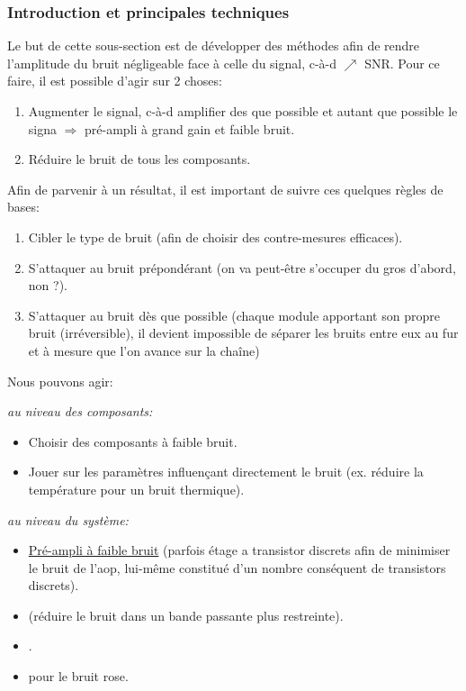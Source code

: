 \subsubsection{Introduction et principales techniques}
Le but de cette sous-section est de développer des méthodes afin de rendre l'amplitude du bruit négligeable face à celle du signal, c-à-d \(\nearrow\) SNR. Pour ce faire, il est possible d'agir sur 2 choses:
\begin{enumerate}
	\item Augmenter le signal, c-à-d amplifier des que possible et autant que possible le signa \(\Rightarrow\) pré-ampli à grand gain et faible bruit.
	\item Réduire le bruit de tous les composants.
\end{enumerate}
Afin de parvenir à un résultat, il est important de suivre ces quelques règles de bases:
\begin{enumerate}
	\item Cibler le type de bruit (afin de choisir des contre-mesures efficaces).
	\item S'attaquer au bruit prépondérant (on va peut-être s'occuper du gros d'abord, non ?).
	\item S'attaquer au bruit dès que possible (chaque module apportant son propre bruit (irréversible), il devient impossible de séparer les bruits entre eux au fur et à mesure que l'on avance sur la chaîne)
\end{enumerate}
Nous pouvons agir:
\begin{description}
\item \emph{au niveau des composants:}
\begin{itemize}
	\item Choisir des composants à faible bruit.
	\item Jouer sur les paramètres influençant directement le bruit (ex. réduire la température pour un bruit thermique).
\end{itemize}
\item \emph{au niveau du système:}
\begin{itemize}
	\item \hyperref[subsubsec:entreenobruit]{Pré-ampli à faible bruit} (parfois étage a transistor discrets afin de minimiser le bruit de l'aop, lui-même constitué d'un nombre conséquent de transistors discrets).
	\item {} (réduire le bruit dans un bande passante plus restreinte).
	\item {}.
	\item {} pour le bruit rose.
\end{itemize}
\end{description}
